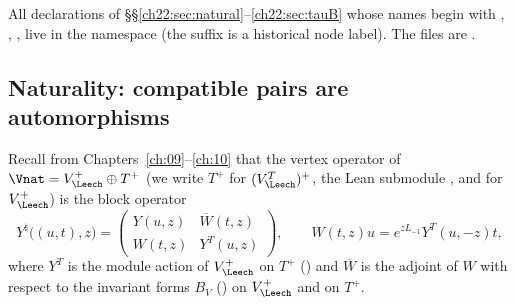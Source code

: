 All declarations of \S\S\ref{ch22:sec:natural}--\ref{ch22:sec:tauB} whose names begin with , ,
,  live in the namespace  (the suffix  is a historical node label).  The files are
.

\subsection{Naturality: compatible pairs are automorphisms}

Recall from Chapters~\ref{ch:09}--\ref{ch:10} that the vertex operator of $\Vnat=V_\Leech^+\oplus T^+$ (we write
$T^+$ for $(V_\Leech^T)^+$, the Lean submodule , and  for $V_\Leech^+$) is the block operator
\begin{equation}\label{ch22:eq:block}
  Y^\natural\bigl((u,t),z\bigr)=\begin{pmatrix}Y(u,z)&\overline W(t,z)\\ W(t,z)&Y^T(u,z)\end{pmatrix},
  \qquad W(t,z)u=e^{zL_{-1}}Y^T(u,-z)t,
\end{equation}
where $Y^T$ is the module action of $V_\Leech^+$ on $T^+$ () and $\overline W$ is the adjoint of
$W$ with respect to the invariant forms $B_V$ () on $V_\Leech^+$ and  on $T^+$.


